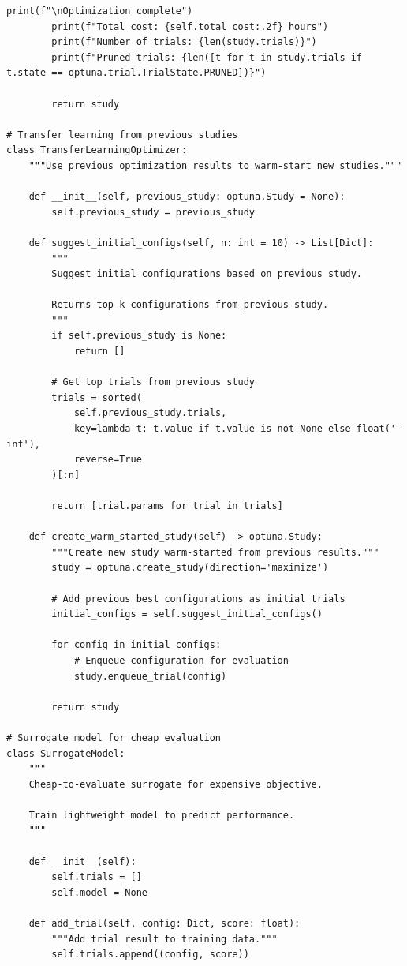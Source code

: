 \begin{lstlisting}[style=python, caption=Cost-efficient hyperparameter optimization]
        print(f"\nOptimization complete")
        print(f"Total cost: {self.total_cost:.2f} hours")
        print(f"Number of trials: {len(study.trials)}")
        print(f"Pruned trials: {len([t for t in study.trials if t.state == optuna.trial.TrialState.PRUNED])}")

        return study

# Transfer learning from previous studies
class TransferLearningOptimizer:
    """Use previous optimization results to warm-start new studies."""

    def __init__(self, previous_study: optuna.Study = None):
        self.previous_study = previous_study

    def suggest_initial_configs(self, n: int = 10) -> List[Dict]:
        """
        Suggest initial configurations based on previous study.

        Returns top-k configurations from previous study.
        """
        if self.previous_study is None:
            return []

        # Get top trials from previous study
        trials = sorted(
            self.previous_study.trials,
            key=lambda t: t.value if t.value is not None else float('-inf'),
            reverse=True
        )[:n]

        return [trial.params for trial in trials]

    def create_warm_started_study(self) -> optuna.Study:
        """Create new study warm-started from previous results."""
        study = optuna.create_study(direction='maximize')

        # Add previous best configurations as initial trials
        initial_configs = self.suggest_initial_configs()

        for config in initial_configs:
            # Enqueue configuration for evaluation
            study.enqueue_trial(config)

        return study

# Surrogate model for cheap evaluation
class SurrogateModel:
    """
    Cheap-to-evaluate surrogate for expensive objective.

    Train lightweight model to predict performance.
    """

    def __init__(self):
        self.trials = []
        self.model = None

    def add_trial(self, config: Dict, score: float):
        """Add trial result to training data."""
        self.trials.append((config, score))


\end{lstlisting}
